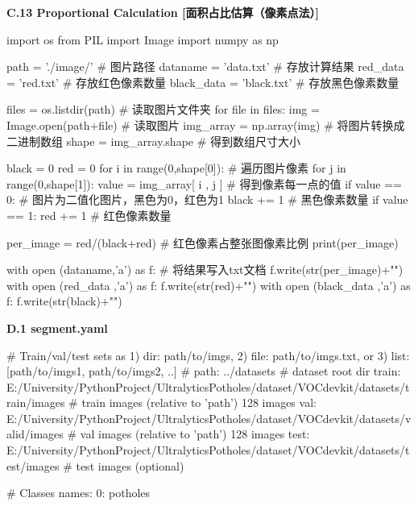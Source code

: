 \documentclass{MathorCupmodeling}
\begin{document}
\textbf{C.13 Proportional Calculation [面积占比估算（像素点法）]}
\begin{python}
import os
from PIL import Image
import numpy as np
 
path = './image/'    # 图片路径
dataname = 'data.txt'   # 存放计算结果
red_data = 'red.txt'    # 存放红色像素数量
black_data = 'black.txt'   # 存放黑色像素数量
 
files = os.listdir(path)    # 读取图片文件夹
for file in files:
     img = Image.open(path+file)    # 读取图片
     img_array = np.array(img)       # 将图片转换成二进制数组
     shape = img_array.shape        # 得到数组尺寸大小

 
     black = 0
     red = 0
     for i in range(0,shape[0]):      # 遍历图片像素
          for j in range(0,shape[1]):
               value = img_array[ i , j ]     # 得到像素每一点的值
               if value == 0:               # 图片为二值化图片，黑色为0，红色为1
                     black += 1   # 黑色像素数量
               if value == 1: 
                     red += 1    # 红色像素数量

     per_image = red/(black+red)    # 红色像素占整张图像素比例
     print(per_image)

     with open (dataname,'a') as f:      # 将结果写入txt文档
             f.write(str(per_image)+"\n")
     with open (red_data ,'a') as f:
             f.write(str(red)+"\n")
     with open (black_data ,'a') as f:
             f.write(str(black)+"\n")
\end{python}

\newpage

\textbf{D.1 segment.yaml}
\begin{python}
# Train/val/test sets as 1) dir: path/to/imgs, 2) file: path/to/imgs.txt, or 3) list: [path/to/imgs1, path/to/imgs2, ..]
# path: ../datasets  # dataset root dir
train: E:/University/PythonProject/UltralyticsPotholes/dataset/VOCdevkit/datasets/train/images  # train images (relative to 'path') 128 images
val: E:/University/PythonProject/UltralyticsPotholes/dataset/VOCdevkit/datasets/valid/images  # val images (relative to 'path') 128 images
test: E:/University/PythonProject/UltralyticsPotholes/dataset/VOCdevkit/datasets/test/images # test images (optional)

# Classes
names:
  0: potholes
\end{python}
\end{document}
